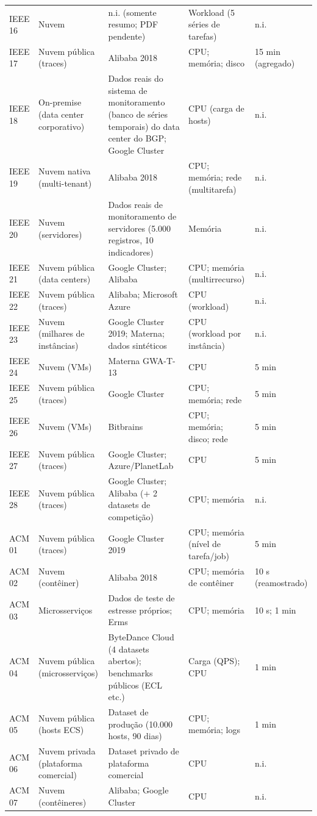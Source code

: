 {\begin{longtable}{p{1.3cm}p{3.2cm}p{5.0cm}p{3.5cm}p{1.8cm}}
IEEE 16 & Nuvem & n.i. (somente resumo; PDF pendente) & Workload (5 séries de tarefas) & n.i. \\
IEEE 17 & Nuvem pública (traces) & Alibaba 2018 & CPU; memória; disco & 15 min (agregado) \\
IEEE 18 & On-premise (data center corporativo) & Dados reais do sistema de monitoramento (banco de séries temporais) do data center do BGP; Google Cluster & CPU (carga de hosts) & n.i. \\
IEEE 19 & Nuvem nativa (multi-tenant) & Alibaba 2018 & CPU; memória; rede (multitarefa) & n.i. \\
IEEE 20 & Nuvem (servidores) & Dados reais de monitoramento de servidores (5.000 registros, 10 indicadores) & Memória & n.i. \\
IEEE 21 & Nuvem pública (data centers) & Google Cluster; Alibaba & CPU; memória (multirrecurso) & n.i. \\
IEEE 22 & Nuvem pública (traces) & Alibaba; Microsoft Azure & CPU (workload) & n.i. \\
IEEE 23 & Nuvem (milhares de instâncias) & Google Cluster 2019; Materna; dados sintéticos & CPU (workload por instância) & n.i. \\
IEEE 24 & Nuvem (VMs) & Materna GWA-T-13 & CPU & 5 min \\
IEEE 25 & Nuvem pública (traces) & Google Cluster & CPU; memória; rede & 5 min \\
IEEE 26 & Nuvem (VMs) & Bitbrains & CPU; memória; disco; rede & 5 min \\
IEEE 27 & Nuvem pública (traces) & Google Cluster; Azure/PlanetLab & CPU & 5 min \\
IEEE 28 & Nuvem pública (traces) & Google Cluster; Alibaba (+ 2 datasets de competição) & CPU; memória & n.i. \\
ACM 01 & Nuvem pública (traces) & Google Cluster 2019 & CPU; memória (nível de tarefa/job) & 5 min \\
ACM 02 & Nuvem (contêiner) & Alibaba 2018 & CPU; memória de contêiner & 10 s (reamostrado) \\
ACM 03 & Microsserviços & Dados de teste de estresse próprios; Erms & CPU; memória & 10 s; 1 min \\
ACM 04 & Nuvem pública (microsserviços) & ByteDance Cloud (4 datasets abertos); benchmarks públicos (ECL etc.) & Carga (QPS); CPU & 1 min \\
ACM 05 & Nuvem pública (hosts ECS) & Dataset de produção (10.000 hosts, 90 dias) & CPU; memória; logs & 1 min \\
ACM 06 & Nuvem privada (plataforma comercial) & Dataset privado de plataforma comercial & CPU & n.i. \\
ACM 07 & Nuvem (contêineres) & Alibaba; Google Cluster & CPU & n.i. \\
\end{longtable}
}
